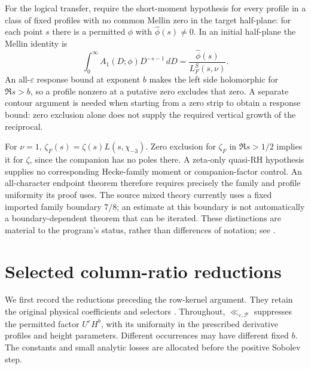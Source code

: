 \documentclass[11pt]{article}
\theoremstyle{definition}
\newcommand{\N}{\mathrm N}
\newcommand{\eps}{\varepsilon}
\newcommand{\lls}{\ll_{\eps,\mathcal P}}
\begin{document}
For the logical transfer, require the short-moment hypothesis for every profile in a class of fixed profiles with no
common Mellin zero in the target half-plane: for each point \(s\) there
is a permitted \(\phi\) with \(\widehat\phi(s)\ne0\).  In an initial
half-plane the Mellin identity is
\[
 \int_0^\infty A_1(D;\phi)D^{-s-1}\,dD
                =\frac{\widehat\phi(s)}{L_F^S(s,\nu)}.
\]
An all-\(\eps\) response bound at exponent \(b\) makes the left side
holomorphic for \(\Re s>b\), so a profile nonzero at a putative zero
excludes that zero.  A separate contour argument is needed when starting
from a zero strip to obtain a response bound: zero exclusion alone does
not supply the required vertical growth of the reciprocal.

For \(\nu=1\),
\(\zeta_F(s)=\zeta(s)L(s,\chi_{-3})\).  Zero exclusion for
\(\zeta_F\) in \(\Re s>1/2\) implies it for \(\zeta\), since the
companion has no poles there.  A zeta-only quasi-RH hypothesis supplies
no corresponding Hecke-family moment or companion-factor control.
An all-character endpoint theorem therefore requires precisely the
family and profile uniformity its proof uses.  The source mixed theory
currently uses a fixed imported family boundary \(7/8\); an estimate
at this boundary is not automatically a boundary-dependent theorem
that can be iterated.  These distinctions are material to the program's
status, rather than differences of notation; see \cite{df,sf,amplification}.



\section{Selected column-ratio reductions}\label{early-sec-cutoffs}

We first record the reductions preceding the row-kernel argument.
They retain the original physical coefficients and selectors
\cite{n1,n2}.  Throughout, \(\lls\) suppresses the permitted factor
\(U^\eps H^b\), with its uniformity in the prescribed derivative
profiles and height parameters.  Different occurrences may have different
fixed \(b\).  The constants and small analytic losses are allocated before
the positive Sobolev step.
\end{document}
